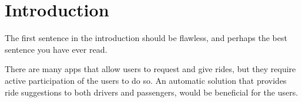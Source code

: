 \chapter{Introduction}\label{ch:introduction}

The first sentence in the introduction should be flawless, and perhaps the best sentence you have ever read.

There are many apps that allow users to request and give rides, but they require active participation of the users to do so. An automatic solution that provides ride suggestions to both drivers and passengers, would be beneficial for the users. 


